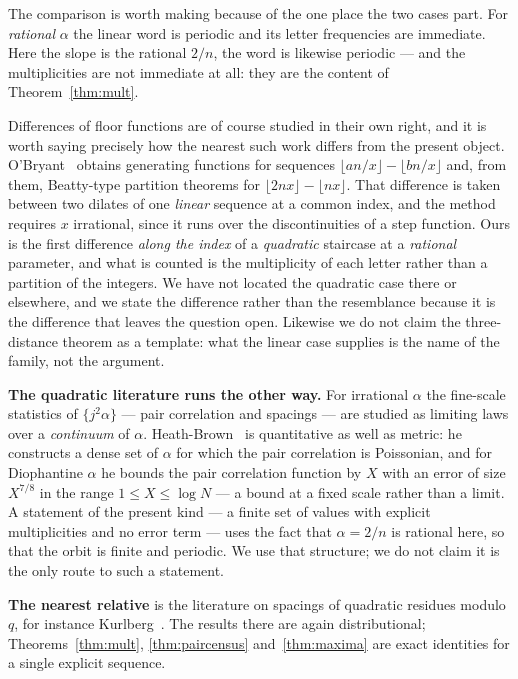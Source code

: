\documentclass[11pt,reqno]{amsart}
\theoremstyle{plain}
\theoremstyle{remark}
\numberwithin{equation}{section}
\begin{document}
The comparison is worth making because of the one place the two cases part.
For \emph{rational} $\alpha$ the linear word is periodic and its letter
frequencies are immediate. Here the slope is the rational $2/n$, the word is
likewise periodic --- and the multiplicities are not immediate at all: they are
the content of Theorem~\ref{thm:mult}.

Differences of floor functions are of course studied in their own right, and it
is worth saying precisely how the nearest such work differs from the present
object. O'Bryant~\cite{ob} obtains generating functions for sequences
$\lfloor a n/x\rfloor - \lfloor b n/x\rfloor$ and, from them, Beatty-type
partition theorems for $\lfloor 2nx\rfloor - \lfloor nx\rfloor$. That
difference is taken between two dilates of one \emph{linear} sequence at a
common index, and the method requires $x$ irrational, since it runs over the
discontinuities of a step function. Ours is the first difference \emph{along
the index} of a \emph{quadratic} staircase at a \emph{rational} parameter, and
what is counted is the multiplicity of each letter rather than a partition of
the integers. We have not located the quadratic case there or elsewhere, and we
state the difference rather than the resemblance because it is the difference
that leaves the question open. Likewise we do not claim the three-distance
theorem as a template: what the linear case supplies is the name of the family,
not the argument.

\medskip\noindent
\textbf{The quadratic literature runs the other way.} For irrational $\alpha$
the fine-scale statistics of $\{j^2\alpha\}$ --- pair correlation and spacings
--- are studied as limiting laws over a \emph{continuum} of $\alpha$.
Heath-Brown~\cite{hb} is quantitative as well as metric: he constructs a dense
set of $\alpha$ for which the pair correlation is Poissonian, and for
Diophantine $\alpha$ he bounds the pair correlation function by $X$ with an
error of size $X^{7/8}$ in the range $1 \le X \le \log N$ --- a bound at a fixed
scale rather than a limit. A statement of the present kind --- a finite set of
values with explicit multiplicities and no error term --- uses the fact that
$\alpha = 2/n$ is rational here, so that the orbit is finite and periodic. We
use that structure; we do not claim it is the only route to such a statement.

\medskip\noindent
\textbf{The nearest relative} is the literature on spacings of quadratic
residues modulo $q$, for instance Kurlberg~\cite{kurlberg}. The results there
are again distributional; Theorems~\ref{thm:mult}, \ref{thm:paircensus}
and~\ref{thm:maxima} are exact identities for a single explicit sequence.
\end{document}
